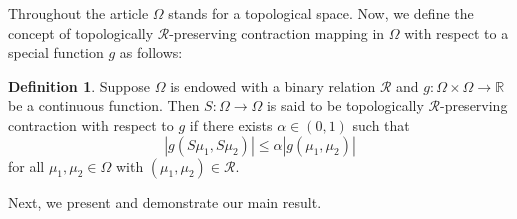 \documentclass[10pt, reqno]{amsart}
\theoremstyle{definition}
\newtheorem{definition}[theorem]{Definition}
\theoremstyle{remark}
\numberwithin{equation}{section}
\begin{document}
Throughout  the article   $ \Omega $ stands for a topological space. 
Now, we define the concept of topologically $\mathcal{R}$-preserving contraction mapping in   $ \Omega $ with respect to a special function $g$ as follows:

\begin{definition} 
	Suppose $ \Omega $ is endowed with a binary relation $\mathcal{R}$ and $g: \Omega \times \Omega \to\mathbb{R}$  be a continuous function. Then $ S : \Omega \to \Omega $ is said to be topologically $\mathcal{R}$-preserving contraction with respect to $g$ if there exists $\alpha\in ( 0, 1 ) $ such that
 \begin{equation*}
 	|g ( S \mu_1, S \mu_2 ) | \leq \alpha | g ( \mu_1, \mu_2 ) |
 \end{equation*} 
for all $ \mu_1, \mu_2 \in \Omega $ with $ ( \mu_1, \mu_2 ) \in \mathcal{R} $.
\end{definition}

Next, we present and demonstrate our main result.
\end{document}
